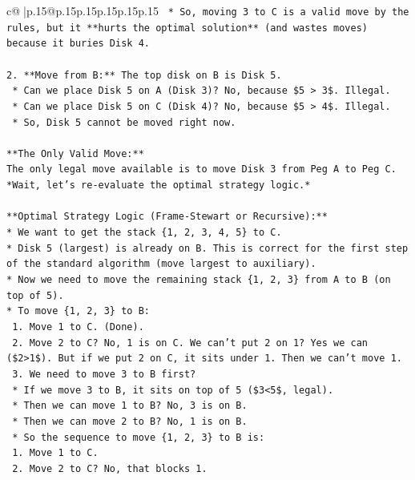 \documentclass{article}
\begin{document}
{\begin{supertabular}{c@{$\;$}|p{.15\linewidth}@{}p{.15\linewidth}p{.15\linewidth}p{.15\linewidth}p{.15\linewidth}p{.15\linewidth}}
{{{\texttt{    *   So, moving 3 to C is a valid move by the rules, but it **hurts the optimal solution** (and wastes moves) because it buries Disk 4.} \\
\\ 
\texttt{2.  **Move from B:** The top disk on B is Disk 5.} \\
\texttt{    *   Can we place Disk 5 on A (Disk 3)? No, because \$5 > 3\$. Illegal.} \\
\texttt{    *   Can we place Disk 5 on C (Disk 4)? No, because \$5 > 4\$. Illegal.} \\
\texttt{    *   So, Disk 5 cannot be moved right now.} \\
\\ 
\texttt{**The Only Valid Move:**} \\
\texttt{The only legal move available is to move Disk 3 from Peg A to Peg C.} \\
\texttt{*Wait, let's re{-}evaluate the optimal strategy logic.*} \\
\\ 
\texttt{**Optimal Strategy Logic (Frame{-}Stewart or Recursive):**} \\
\texttt{*   We want to get the stack \{1, 2, 3, 4, 5\} to C.} \\
\texttt{*   Disk 5 (largest) is already on B. This is correct for the first step of the standard algorithm (move largest to auxiliary).} \\
\texttt{*   Now we need to move the remaining stack \{1, 2, 3\} from A to B (on top of 5).} \\
\texttt{*   To move \{1, 2, 3\} to B:} \\
\texttt{    1.  Move 1 to C. (Done).} \\
\texttt{    2.  Move 2 to C? No, 1 is on C. We can't put 2 on 1? Yes we can (\$2>1\$). But if we put 2 on C, it sits under 1. Then we can't move 1.} \\
\texttt{    3.  We need to move 3 to B first?} \\
\texttt{        *   If we move 3 to B, it sits on top of 5 (\$3<5\$, legal).} \\
\texttt{        *   Then we can move 1 to B? No, 3 is on B.} \\
\texttt{        *   Then we can move 2 to B? No, 1 is on B.} \\
\texttt{    *   So the sequence to move \{1, 2, 3\} to B is:} \\
\texttt{        1.  Move 1 to C.} \\
\texttt{        2.  Move 2 to C? No, that blocks 1.} \\
}}}
\end{supertabular}}
\end{document}
